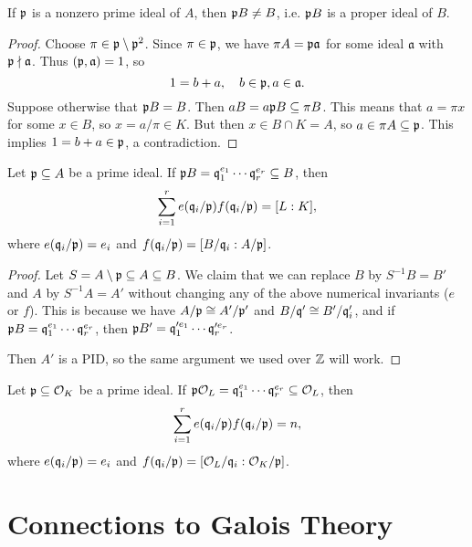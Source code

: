 \begin{lemma}
  If $\mathfrak{p}$ is a nonzero prime ideal of $A$, then
  $\mathfrak{p} B \ne B$, i.e. $\mathfrak{p} B$ is a proper ideal of $B$.
\end{lemma}

\begin{proof}
  Choose $\pi \in \mathfrak{p} \setminus \mathfrak{p}^2$. Since
  $\pi \in \mathfrak{p}$, we have $\pi A = \mathfrak{p} \mathfrak{a}$ for
  some ideal $\mathfrak{a}$ with $\mathfrak{p} \nmid \mathfrak{a}$.
  Thus $(\mathfrak{p}, \mathfrak{a}) = 1$, so
  \[
    1 = b + a, \quad b \in \mathfrak{p}, a \in \mathfrak{a}.
  \]
  Suppose otherwise that $\mathfrak{p} B = B$. Then
  $a B = a \mathfrak{p} B \subseteq \pi B$. This means that
  $a = \pi x$ for some $x \in B$, so
  $x = a / \pi \in K$. But then
  $x \in B \cap K = A$, so $a \in \pi A \subseteq \mathfrak{p}$.
  This implies
  $1 = b + a \in \mathfrak{p}$, a contradiction.
\end{proof}

\begin{theorem}
  Let $\mathfrak{p} \subseteq A$ be a prime ideal.
  If $\mathfrak{p} B = \mathfrak{q}_1^{e_1} \cdots \mathfrak{q}_r^{e_r} \subseteq B$, then
  \[
    \sum_{i = 1}^r e(\mathfrak{q}_i / \mathfrak{p}) f(\mathfrak{q}_i / \mathfrak{p}) = [L : K],
  \]
  where $e(\mathfrak{q}_i / \mathfrak{p}) = e_i$ and
  $f(\mathfrak{q}_i / \mathfrak{p}) = [B / \mathfrak{q}_i : A / \mathfrak{p}]$.
\end{theorem}

\begin{proof}
  Let $S = A \setminus \mathfrak{p} \subseteq A \subseteq B$.
  We claim that we can replace $B$ by $S^{-1} B = B'$ and
  $A$ by $S^{-1} A = A'$ without changing any of the
  above numerical invariants ($e$ or $f$).
  This is because we have $A / \mathfrak{p} \cong A' / \mathfrak{p}'$ and
  $B / \mathfrak{q}' \cong B' / \mathfrak{q}_i'$, and if
  $\mathfrak{p} B = \mathfrak{q}_1^{e_1} \cdots \mathfrak{q}_r^{e_r}$, then
  $\mathfrak{p} B' = \mathfrak{q}_1'^{e_1} \cdots \mathfrak{q}_r'^{e_r}$.

  Then $A'$ is a PID, so the same argument we used
  over $\mathbb{Z}$ will work.
\end{proof}

\begin{corollary}
  Let $\mathfrak{p} \subseteq \mathcal{O}_K$ be a prime ideal.
  If $\mathfrak{p} \mathcal{O}_L = \mathfrak{q}_1^{e_1} \cdots \mathfrak{q}_r^{e_r} \subseteq \mathcal{O}_L$, then
  \[
    \sum_{i = 1}^r e(\mathfrak{q}_i / \mathfrak{p}) f(\mathfrak{q}_i / \mathfrak{p}) = n,
  \]
  where $e(\mathfrak{q}_i / \mathfrak{p}) = e_i$ and
  $f(\mathfrak{q}_i / \mathfrak{p}) = [\mathcal{O}_L / \mathfrak{q}_i : \mathcal{O}_K / \mathfrak{p}]$.
\end{corollary}

\section{Connections to Galois Theory}

